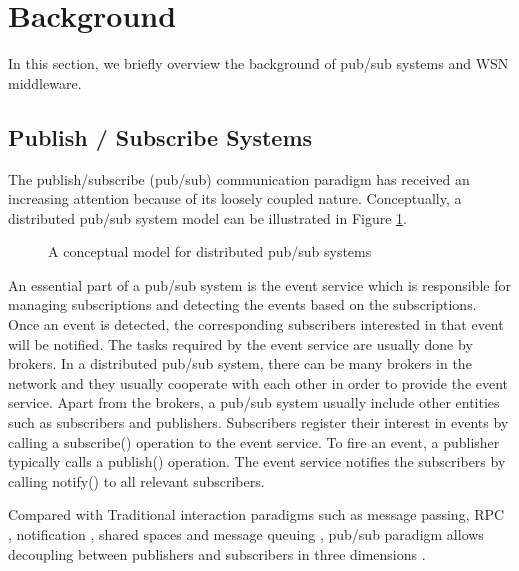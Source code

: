 \section{Background}
\label{sec:background}
In this section, we briefly overview the background of pub/sub systems and WSN middleware.

\subsection{Publish / Subscribe Systems}
The publish/subscribe (pub/sub) communication paradigm has received an increasing attention because of its loosely coupled nature. Conceptually, a distributed pub/sub system model can be illustrated in Figure \ref{fig:pubsub}.

\begin{figure}
\centering
{}
\caption{A conceptual model for distributed pub/sub systems}
\label{fig:pubsub}
\end{figure}

An essential part of a pub/sub system is the event service which is responsible for managing subscriptions and detecting the events based on the subscriptions. Once an event is detected, the corresponding subscribers interested in that event will be notified. The tasks required by the event service are usually done by brokers. In a distributed pub/sub system, there can be many brokers in the network and they usually cooperate with each other in order to provide the event service. Apart from the brokers, a pub/sub system usually include other entities such as subscribers and publishers. Subscribers register their interest in events by calling a subscribe() operation to the event service. To fire an event, a publisher typically calls a publish() operation. The event service notifies the subscribers by calling notify() to all relevant subscribers.

Compared with Traditional interaction paradigms such as message passing, RPC \cite{rpc}, notification \cite{designpattern}, shared spaces \cite{linda} and message queuing \cite{mom}, pub/sub paradigm allows decoupling between publishers and subscribers in three dimensions \cite{facespubsub}.

